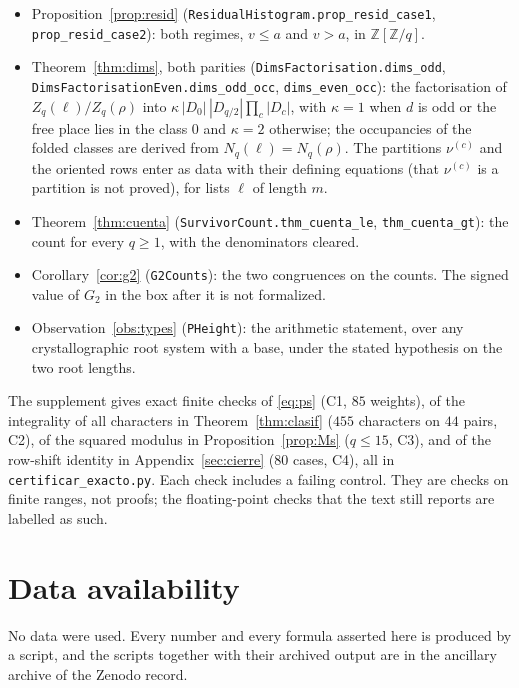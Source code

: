 \documentclass[11pt,a4paper]{article}
\theoremstyle{definition}
\newcommand{\ZZ}{\mathbb{Z}}
\begin{document}
\begin{itemize}
\texttt{prop\_res\_cap}).
\item Proposition~\ref{prop:resid} (\texttt{ResidualHistogram.}\allowbreak\texttt{prop\_resid\_case1},
\texttt{prop\_resid\_case2}): both regimes, $v\le a$ and $v>a$, in $\ZZ[\ZZ/q]$.
\item Theorem~\ref{thm:dims}, both parities (\texttt{DimsFactorisation.}\allowbreak\texttt{dims\_odd},
\texttt{DimsFactorisationEven.}\allowbreak\texttt{dims\_odd\_occ}, \texttt{dims\_even\_occ}): the factorisation of
$Z_q(\ell)/Z_q(\rho)$ into $\kappa\,|D_0|\,|D_{q/2}|\prod_c|D_c|$, with $\kappa=1$ when $d$ is odd or
the free place lies in the class $0$ and $\kappa=2$ otherwise; the occupancies of the folded classes
are derived from $N_q(\ell)=N_q(\rho)$. The partitions $\nu^{(c)}$ and the oriented rows enter as
data with their defining equations (that $\nu^{(c)}$ is a partition is not proved), for lists $\ell$
of length $m$.
\item Theorem~\ref{thm:cuenta} (\texttt{SurvivorCount.}\allowbreak\texttt{thm\_cuenta\_le}, \texttt{thm\_cuenta\_gt}):
the count for every $q\ge1$, with the denominators cleared.
\item Corollary~\ref{cor:g2} (\texttt{G2Counts}): the two congruences on the counts. The signed
value of $G_2$ in the box after it is not formalized.
\item Observation~\ref{obs:types} (\texttt{PHeight}): the arithmetic statement, over any
crystallographic root system with a base, under the stated hypothesis on the two root lengths.
\end{itemize}
\endgroup
The supplement gives exact finite checks of \eqref{eq:ps} (C1, $85$ weights), of the integrality of
all characters in Theorem~\ref{thm:clasif} ($455$ characters on $44$ pairs, C2), of the squared
modulus in Proposition~\ref{prop:Ms} ($q\le15$, C3), and of the row-shift identity in
Appendix~\ref{sec:cierre} ($80$ cases, C4), all in \texttt{certificar\_exacto.py}. Each check
includes a failing control. They are checks on finite ranges, not proofs; the floating-point checks
that the text still reports are labelled as such.

\section*{Data availability}

\noindent No data were used. Every number and every formula asserted here is produced by a script,
and the scripts together with their archived output are in the ancillary archive of the Zenodo record.
\end{document}
